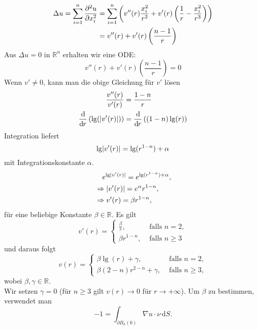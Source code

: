 \begin{align*}
	\Delta u = \sum^{n}_{i=1} \frac{{\partial ^2u}}{{\partial x_i^2}}  &= \sum^{n}_{i=1} \left( v''(r) \frac{x_i^2}{r^2} + v'(r) \left( \frac{1}{r} - \frac{x_i^2}{r^3} \right) \right) \\
	&= v''(r) + v'(r) \left( \frac{n-1}{r} \right)
\end{align*}
Aus $\Delta u = 0$ in $\mathbb{R}^n$ erhalten wir eine ODE:
\begin{equation}
	v''(r) + v'(r)\left( \frac{n-1}{r} \right) = 0  \label{aa}
\end{equation}
Wenn $v' \neq 0$, kann man %
die obige Gleichung für $v'$ lösen
\begin{align}
	\frac{v''(r)}{v'(r)} &= \frac{1-n}{r} \\
	\frac{\mathrm{d}\mkern-1.0mu }{\mathrm{d}\mkern-1.0mu r} \left( \lg(\lvert v'(r)\rvert) \right) &= \frac{\mathrm{d}\mkern-1.0mu }{\mathrm{d}\mkern-1.0mu r}  \left( (1-n) \lg(r) \right)
\end{align}
Integration liefert 
\begin{equation}
	\lg \lvert v'(r)\rvert = \lg( r ^{1-n}) + \alpha
\end{equation}
mit Integrationskonstante $\alpha$.
\begin{align*}
	&\hphantom{\Rightarrow} e^{\lg \lvert v'(r)\rvert} = e^{\lg(r^{1-n})+\alpha}, \\
	&\Rightarrow \lvert v'(r)\rvert = e^{\alpha} r^{1-n}, \\
	&\Rightarrow v'(r) = \beta r^{1-n},
\end{align*}
für eine beliebige Konstante $\beta \in \mathbb{R}$. Es gilt
\begin{equation}
	v'(r) = \begin{cases}
		\frac{\beta}{r}, &\text{ falls } n = 2,\\
		\beta r^{1-n}, &\text{ falls } n \geq 3		
	\end{cases}
\end{equation}
und daraus folgt
\begin{equation}
	v(r) = \begin{cases}
		\beta \lg(r)+ \gamma, &\text{ falls } n = 2,\\
		\beta (2-n) r^{2-n} + \gamma , &\text{ falls } n \geq 3,		
	\end{cases}
\end{equation}
wobei $\beta,\gamma \in \mathbb{R}$. \\
Wir setzen $ \gamma = 0$ (für $n \geq 3$ gilt $v(r) \to 0$ für $r \to +\infty$). Um $\beta$ zu bestimmen, verwendet man 
\begin{equation}
	-1 = \int_{\partial B_k(0)}^{}  \nabla  u \cdot \nu \,\mathrm{d}S. \label{(6)}
\end{equation}

